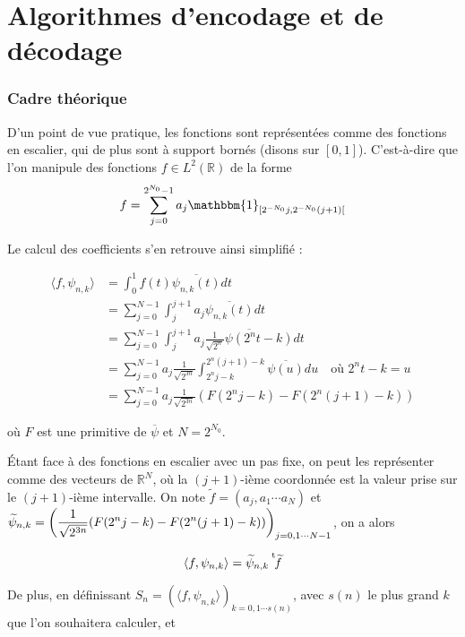 \newpage

\part{Algorithmes d'encodage et de décodage}

\section{Cadre théorique}

D'un point de vue pratique, les fonctions sont représentées comme des fonctions en escalier, qui de plus sont à support bornés (disons sur $[0, 1]$). C'est-à-dire que l'on manipule des fonctions $f \in L^2(\mathbb{R})$ de la forme $$f = \sum_{j = 0}^{2^{N_0} - 1} a_j \mathbbm{1}_{[2^{-N_0}j, 2^{-N_0}(j+1)[}$$

Le calcul des coefficients s'en retrouve ainsi simplifié :

\begin{align*}
	\langle f, \psi_{n, k} \rangle &= \int_0^1 f(t) \overline{\psi_{n, k}(t)} dt \\
	&= \sum_{j=0}^{N-1} \int_{j}^{j+1} a_j \overline{\psi_{n, k}(t)} dt \\
	&= \sum_{j=0}^{N-1} \int_{j}^{j+1} a_j \overline{\frac{1}{\sqrt{2^n}} \psi(2^n t - k)} dt \\
	&= \sum_{j=0}^{N-1} a_j \frac{1}{\sqrt{2^{3n}}} \int_{2^n j - k}^{2^n(j+1) - k} \overline{\psi(u)} du \quad \text{où $2^nt - k = u$} \\
	&= \sum_{j=0}^{N-1} a_j \frac{1}{\sqrt{2^{3n}}} (F(2^n j - k) - F(2^n (j+1) - k))
\end{align*}

où $F$ est une primitive de $\overline{\psi}$ et $N = 2^{N_0}$.

Étant face à des fonctions en escalier avec un pas fixe, on peut les représenter comme des vecteurs de $\mathbb{R}^N$, où la $(j+1)$-ième coordonnée est la valeur prise sur le $(j+1)$-ième intervalle. On note $\tilde{f} = (a_j, a_1 \cdots a_N)$ et $\displaystyle \widetilde{\psi}_{n, k} = \left(\frac{1}{\sqrt{2^{3n}}} (F(2^n j - k) - F(2^n (j+1) - k))\right)_{j = 0, 1 \cdots N - 1}$, on a alors 

$$\langle f, \psi_{n, k} \rangle =\widetilde{\psi}_{n, k} \mskip1mu\prescript{\smash{\mathrm t\mkern-3mu}}{}{\mathstrut\widetilde{f}}$$

De plus, en définissant $S_n = (\langle f, \psi_{n, k}\rangle)_{k = 0, 1 \cdots s(n)}$, avec $s(n)$ le plus grand $k$ que l'on souhaitera calculer, et

